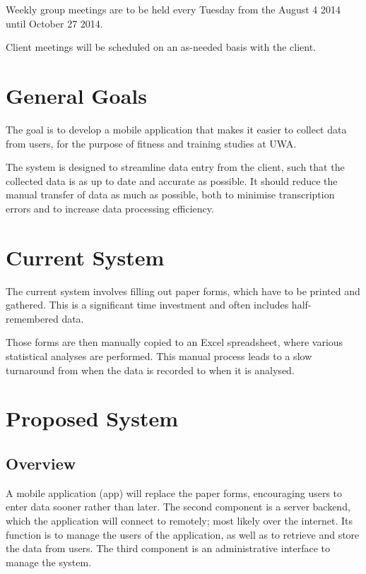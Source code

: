 \documentclass[a4paper, 11pt, titlepage]{article}
\begin{document}
Weekly group meetings are to be held every Tuesday from the August 4 2014 until October 27 2014. 

Client meetings will be scheduled on an as-needed basis with the client.

\pagebreak

\begingroup
\linespread{0.7}
\hypersetup{linkcolor=black}
\tableofcontents
\endgroup

\pagebreak
{}

\section{General Goals}
The goal is to develop a mobile application that makes it easier to collect data from users, for the purpose of fitness and training studies at UWA.

The system is designed to streamline data entry from the client, such that the collected data is as up to date and accurate as possible. It should reduce the manual transfer of data as much as possible, both to minimise transcription errors and to increase data processing efficiency. 

\section{Current System}
The current system involves filling out paper forms, which have to be printed and gathered. This is a significant time investment and often includes half-remembered data. 

Those forms are then manually copied to an Excel spreadsheet, where various statistical analyses are performed. This manual process leads to a slow turnaround from when the data is recorded to when it is analysed.

\section{Proposed System}
\subsection{Overview}
A mobile application (app) will replace the paper forms, encouraging users to enter data sooner rather than later. The second component is a server backend, which the application will connect to remotely; most likely over the internet. Its function is to manage the users of the application, as well as to retrieve and store the data from users. The third component is an administrative interface to manage the system.
\end{document}
